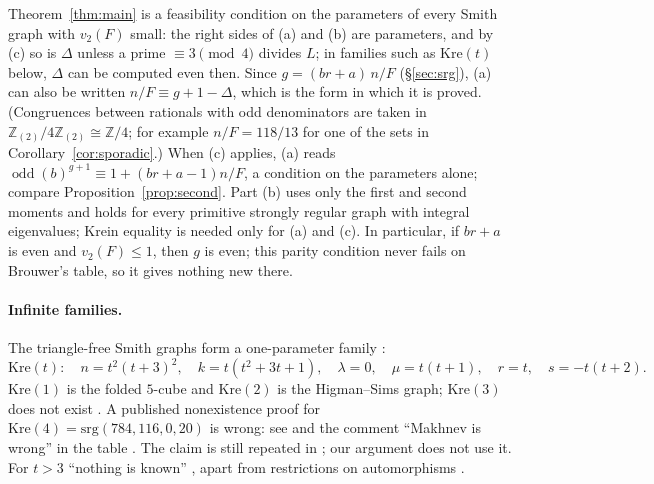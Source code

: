 \documentclass[11pt]{article}
\theoremstyle{definition}
\theoremstyle{remark}
\newcommand{\Z}{\mathbb Z}
\newcommand{\Zt}{\Z_{(2)}}
\newcommand{\odd}{\operatorname{odd}}
\newcommand{\Kre}{\mathrm{Kre}}
\begin{document}
Theorem~\ref{thm:main} is a feasibility condition on the parameters of every
Smith graph with $v_2(F)$ small: the right sides of (a) and (b) are
parameters, and by (c) so is $\Delta$ unless a prime $\equiv3\pmod4$ divides
$L$; in families such as $\Kre(t)$ below, $\Delta$ can be computed even then.
Since $g=(br+a)\,n/F$ (\S\ref{sec:srg}), (a) can also be written
$n/F\equiv g+1-\Delta$, which is the form in which it is proved. (Congruences
between rationals with odd denominators are taken in $\Zt/4\Zt\cong\Z/4$; for
example $n/F=118/13$ for one of the sets in Corollary~\ref{cor:sporadic}.)
When (c) applies, (a) reads $\odd(b)^{g+1}\equiv1+(br+a-1)n/F$, a condition on
the parameters alone; compare Proposition~\ref{prop:second}. Part (b) uses
only the first and second moments and holds for every primitive strongly
regular graph with integral eigenvalues; Krein equality is needed only for (a)
and (c). In particular, if $br+a$ is even and $v_2(F)\le1$, then $g$ is even;
this parity condition never fails on Brouwer's table, so it gives nothing new
there.

\paragraph{Infinite families.}
The triangle-free Smith graphs form a one-parameter family \cite[\S8.5]{BvM}:
\[
 \Kre(t):\quad n=t^2(t+3)^2,\quad k=t(t^2+3t+1),\quad \lambda=0,\quad
 \mu=t(t+1),\quad r=t,\quad s=-t(t+2).
\]
$\Kre(1)$ is the folded $5$-cube and $\Kre(2)$ is the Higman--Sims graph;
$\Kre(3)$ does not exist \cite{GM,KO}. A published nonexistence proof for
$\Kre(4)=\mathrm{srg}(784,116,0,20)$ \cite{Makhnev} is wrong: see
\cite[\S1.1, after Table~1.2]{BvM} and the comment ``Makhnev is wrong'' in the
table \cite[\texttt{srgtab751-800}]{Tab}. The claim is still repeated in
\cite{CMN}; our argument does not use it. For $t>3$ ``nothing is known''
\cite[\S8.5]{BvM}, apart from restrictions on automorphisms \cite{MN}.
\end{document}
